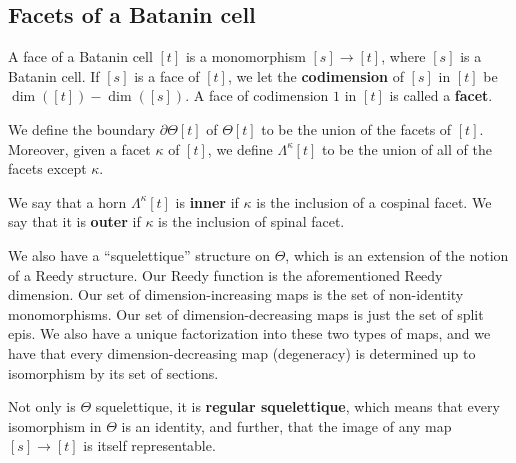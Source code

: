 \documentclass[10pt]{amsart}
\numberwithin{equation}{section}
\theoremstyle{plain}   %
\theoremstyle{remark}
\theoremstyle{plain}
\newcommand{\dfn}{\textbf}
\begin{document}
\subsection{Facets of a Batanin cell}
A face of a Batanin cell \([t]\) is a monomorphism \([s] \to [t]\), where \([s]\) is a Batanin cell.  If \([s]\) is a face of \([t]\), we let the \dfn{codimension} of \([s]\) in \([t]\) be \(\dim([t])-\dim([s])\).  A face of codimension \(1\) in \([t]\) is called a \dfn{facet}.  

We define the boundary \(\partial \Theta[t]\) of \(\Theta[t]\) to be the union of the facets of \([t]\).  Moreover, given a facet \(\kappa\) of \([t]\), we define \(\Lambda^\kappa[t]\) to be the union of all of the facets except \(\kappa\). 

We say that a horn \(\Lambda^\kappa[t]\) is \dfn{inner} if \(\kappa\) is the inclusion of a cospinal facet.  We say that it is \dfn{outer} if \(\kappa\) is the inclusion of spinal facet.  

We also have a ``squelettique'' structure on \(\Theta\), which is an extension of the notion of a Reedy structure. Our Reedy function is the aforementioned Reedy dimension. Our set of dimension-increasing maps is the set of non-identity monomorphisms.   Our set of dimension-decreasing maps is just the set of split epis.  We also have a unique factorization into these two types of maps, and we have that every dimension-decreasing map (degeneracy) is determined up to isomorphism by its set of sections.  

Not only is \(\Theta\) squelettique, it is \dfn{regular squelettique}, which means that every isomorphism in \(\Theta\) is an identity, and further, that the image of any map \([s]\to [t]\) is itself representable.  
\end{document}
